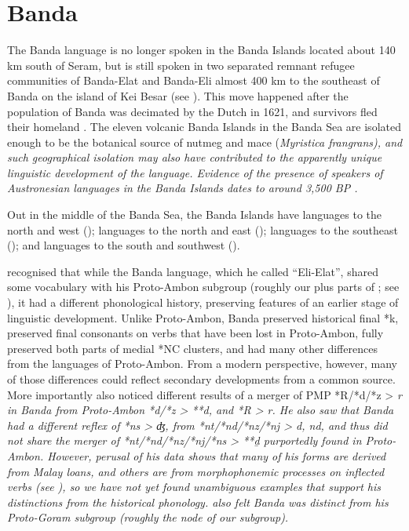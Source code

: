 \chapter{Banda}\label{ch:Ban}
The Banda language is no longer spoken in the Banda Islands located
about 140 km south of Seram,
but is still spoken in two separated remnant refugee communities
of Banda-Elat and Banda-Eli almost 400 km to the southeast of Banda on the
island of Kei Besar (see ).
This move happened after the population of Banda was decimated
by the Dutch in 1621,
and survivors fled their homeland \citep{CollinsKaartinen1998,Collins2003b}.
The eleven volcanic Banda Islands in the Banda Sea are isolated
enough to be the botanical source of nutmeg
and mace (\it{Myristica frangrans}),
and such geographical isolation may also have contributed to
the apparently unique linguistic development of the language.
Evidence of the presence of speakers of Austronesian languages
in the Banda Islands dates to around 3,500 BP \citep{Spriggs2011,Lape2018}.

Out in the middle of the Banda Sea,
the Banda Islands have  languages to the north
and west ();  languages
to the north and east ();  languages to the southeast
(); and  languages to the south and southwest ().

\citet[182--190]{Stresemann1927} recognised that while the Banda
language, which he called “Eli-Elat”,
shared some vocabulary with his Proto-Ambon subgroup (roughly
our  plus parts of ; see ),
it had a different phonological history,
preserving features of an earlier stage of linguistic development.
Unlike Proto-Ambon, Banda preserved historical final *k,
preserved final consonants on verbs that have been lost in Proto-Ambon,
fully preserved both parts of medial *NC clusters,
and had many other differences from the languages of Proto-Ambon.
From a modern perspective,
however, many of those differences could reflect secondary developments
from a common source.
More importantly \citet[185, 188]{Stresemann1927}
also noticed different results of a merger of PMP *R/*d/*z
> \it{r} in Banda from Proto-Ambon *d/*z > **d,
and *R > \it{r}.
He also saw that Banda had a different reflex of *ns > \it{ʤ},
from *nt/*nd/*nz/*nj > \it{d,
nd}, and thus did not share the merger of *nt/*nd/*nz/*nj/*ns
> **ḏ purportedly found in Proto-Ambon.
However, perusal of his data shows that many of his forms are
derived from Malay loans,
and others are from morphophonemic processes on inflected verbs
(see ), so we have not yet found unambiguous examples that support his
distinctions from the historical phonology.
\citeauthor{Stresemann1927} also felt Banda was distinct from his Proto-Goram
subgroup (roughly the  node of our  subgroup).

